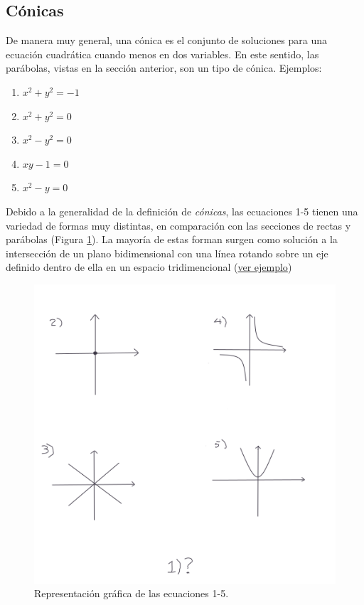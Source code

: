 \documentclass[
]{book}
\providecommand{\tightlist}{%
  \setlength{\itemsep}{0pt}\setlength{\parskip}{0pt}}
\begin{document}
\hypertarget{cuxf3nicas}{%
\subsection{Cónicas}\label{cuxf3nicas}}

De manera muy general, una cónica es el conjunto de soluciones para una ecuación cuadrática cuando menos en dos variables. En este sentido, las parábolas, vistas en la sección anterior, son un tipo de cónica. Ejemplos:

\begin{enumerate}
\def\labelenumi{\arabic{enumi}.}
\tightlist
\item
  \(x^2 + y^2 = -1\)
\item
  \(x^2 + y^2 = 0\)
\item
  \(x^2 - y^2 = 0\)
\item
  \(xy - 1 = 0\)
\item
  \(x^2 - y = 0\)
\end{enumerate}

Debido a la generalidad de la definición de \emph{cónicas}, las ecuaciones 1-5 tienen una variedad de formas muy distintas, en comparación con las secciones de rectas y parábolas (Figura \ref{fig:conicas}). La mayoría de estas forman surgen como solución a la intersección de un plano bidimensional con una línea rotando sobre un eje definido dentro de ella en un espacio tridimencional (\href{https://www.mathplanet.com/Oldsite/media/28029/conic.png}{ver ejemplo})

\begin{figure}

{\centering \includegraphics[width=6.93in]{Unidad-II/conicas} 

}

\caption{Representación gráfica de las ecuaciones 1-5.}\label{fig:conicas}
\end{figure}
\end{document}
